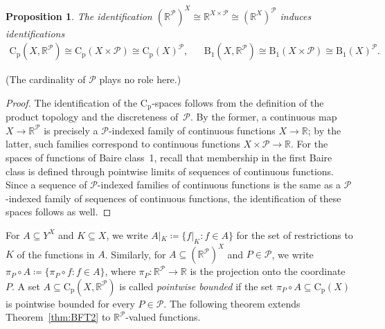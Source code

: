 \documentclass[psamsfonts]{amsart}
\newtheorem{prop}[thm]{Proposition}
\theoremstyle{definition}
\theoremstyle{remark}
\newcommand{\Cp}{\mathrm{C}_{\mathrm{p}}}
\numberwithin{equation}{section}
\begin{document}
\begin{prop}\label{prop:Baire-identifications}
  The identification $(\mathbb{R}^{\mathcal{P}})^X \cong \mathbb{R}^{X\times \mathcal{P}} \cong (\mathbb{R}^X)^{\mathcal{P}}$ induces identifications
  \begin{align*}
  \Cp(X, \mathbb{R}^{\mathcal{P}}) \cong \Cp(X\times \mathcal{P}) \cong \Cp(X)^{\mathcal{P}}, &  &
  \mathrm{B}_1(X, \mathbb{R}^{\mathcal{P}}) \cong \mathrm{B}_1(X\times \mathcal{P}) \cong \mathrm{B}_1(X)^{\mathcal{P}}.
  \end{align*}
\end{prop}
(The cardinality of $\mathcal{P}$ plays no role here.)
\begin{proof}
  The identification of the $\Cp$-spaces follows from the definition of the product topology and the discreteness of~$\mathcal{P}$.
  By the former, a continuous map $X\to \mathbb{R}^{\mathcal{P}}$ is precisely a $\mathcal{P}$-indexed family of continuous functions $X\to \mathbb{R}$;
  by the latter, such families correspond to continuous functions $X\times \mathcal{P}\to \mathbb{R}$.
  For the spaces of functions of Baire class~1, recall that membership in the first Baire class is defined through pointwise limits of sequences of continuous functions.
  Since a sequence of $\mathcal{P}$-indexed families of continuous functions is the same as a $\mathcal{P}$-indexed family of sequences of continuous functions, the identification of these spaces follows as well.
\end{proof}

For $A\subseteq Y^X$ and $K\subseteq X$, we write $A|_K\coloneqq\{f|_K:f\in A\}$ for the set of restrictions to $K$ of the functions in $A$.
Similarly, for $A\subseteq(\mathbb{R}^{\mathcal{P}})^X$ and $P\in\mathcal{P}$, we write $\pi_P\circ A\coloneqq\{\pi_P\circ f:f\in A\}$, where $\pi_P\colon\mathbb{R}^{\mathcal{P}}\to\mathbb{R}$ is the projection onto the coordinate~$P$.
A set $A\subseteq\Cp(X,\mathbb{R}^\mathcal{P})$ is called \emph{pointwise bounded} if the set $\pi_P\circ A\subseteq\Cp(X)$ is pointwise bounded for every $P\in\mathcal{P}$.
The following theorem extends Theorem~\ref{thm:BFT2} to $\mathbb{R}^{\mathcal{P}}$-valued functions.
\end{document}
